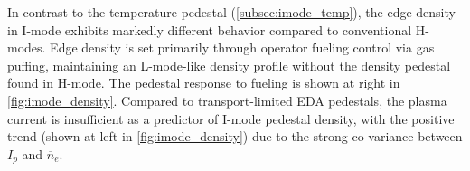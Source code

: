 In contrast to the temperature pedestal (\cref{subsec:imode_temp}), the edge density in I-mode exhibits markedly different behavior compared to conventional H-modes.  Edge density is set primarily through operator fueling control via gas puffing, maintaining an L-mode-like density profile without the density pedestal found in H-mode.  The pedestal response to fueling is shown at right in \cref{fig:imode_density}.  Compared to transport-limited EDA pedestals, the plasma current is insufficient as a predictor of I-mode pedestal density, with the positive trend (shown at left in \cref{fig:imode_density}) due to the strong co-variance between $I_p$ and $\overline{n}_e$.

\begin{figure}[ht]
 \pushtooutside
\end{figure}

